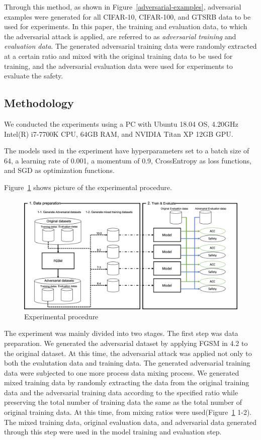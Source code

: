 \documentclass[journal,article,submit,moreauthors,pdftex]{Definitions/mdpi}
\begin{document}
Through this method, as shown in Figure~\ref{adversarial-examples}, adversarial examples were generated for all CIFAR-10, CIFAR-100, and GTSRB data to be used for experiments.
In this paper, the training and evaluation data, to which the adversarial attack is applied, are referred to as {\it adversarial training} and {\it evaluation data}.
The generated adversarial training data were randomly extracted at a certain ratio and mixed with the original training data to be used for training, and the adversarial evaluation data were used for experiments to evaluate the safety.

\subsection{Methodology}

We conducted the experiments using a PC with Ubuntu 18.04 OS, 4.20GHz Intel(R) i7-7700K CPU, 64GB RAM, and NVIDIA Titan XP 12GB GPU.

The models used in the experiment have hyperparameters set to a batch size of 64, a learning rate of 0.001, a momentum of 0.9, CrossEntropy as loss functions, and SGD as optimization functions.

Figure~\ref{methodology} shows picture of the experimental procedure.

\begin{figure}[H]
\includegraphics[width=13 cm]{Definitions/methodology.png}
\caption{Experimental procedure\label{methodology}}
\end{figure} 

The experiment was mainly divided into two stages.
The first step was data preparation. 
We generated the adversarial dataset by applying FGSM in 4.2 to the original dataset.
At this time, the adversarial attack was applied not only to both the evalutation data and training data.
The generated adversarial training data were subjected to one more process data mixing process.
We generated mixed training data by randomly extracting the data from the original training data and the adversarial training data according to the specified ratio while preserving the total number of training data the same as the total number of original training data.
At this time, from mixing ratios were used(Figure~\ref{methodology} 1-2).
The mixed training data, original evaluation data, and adversarial data generated through this step were used in the model training and evaluation step.
\end{document}
